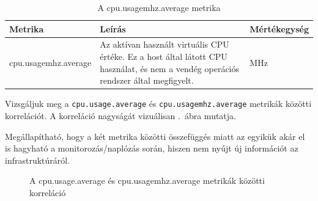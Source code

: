 \documentclass[a4paper,10pt,titlepage]{article}
\begin{document}
\begin{table}[h]
	\caption{A cpu.usagemhz.average metrika}
	\centering
	\small
	\begin{tabular}{| p{3.5cm} | p{7.5cm} | p{2cm} |}
		\hline
		\rowcolor{tc_bone} \textbf{Metrika} & \textbf{Leírás} & \textbf{Mértékegység} \\
		\hline
		cpu.usagemhz.average & Az aktívan használt virtuális CPU értéke. Ez a host által látott CPU használat, és nem a vendég operációs rendszer által megfigyelt. & MHz \\ 
		\hline
	\end{tabular}
	\normalsize
	\label{tab:cpu.usage.average}
\end{table}

Vizsgáljuk meg a \texttt{cpu.usage.average} és \texttt{cpu.usagemhz.average} metrikák közötti korrelációt. A korreláció nagyságát vizuálisan .~ábra mutatja.

Megállapítható, hogy a két metrika közötti összefüggés miatt az egyikük akár el is hagyható a monitorozás/naplózás során, hiszen nem nyújt új információt az infrastruktúráról. 

\begin{figure}[h!]
  \centering
  \caption{A cpu.usage.average és cpu.usagemhz.average metrikák közötti korreláció}
  \label{fig:corrgram-hosts}
\end{figure}
\end{document}
